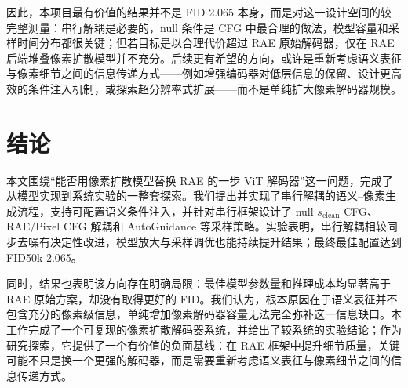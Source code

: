 \documentclass[11pt]{article}
\begin{document}
因此，本项目最有价值的结果并不是 FID 2.065 本身，而是对这一设计空间的较完整测量：串行解耦是必要的，null 条件是 CFG 中最合理的做法，模型容量和采样时间分布都很关键；但若目标是以合理代价超过 RAE 原始解码器，仅在 RAE 后端堆叠像素扩散模型并不充分。后续更有希望的方向，或许是重新考虑语义表征与像素细节之间的信息传递方式——例如增强编码器对低层信息的保留、设计更高效的条件注入机制，或探索超分辨率式扩展——而不是单纯扩大像素解码器规模。

\section{结论}

本文围绕“能否用像素扩散模型替换 RAE 的一步 ViT 解码器”这一问题，完成了从模型实现到系统实验的一整套探索。我们提出并实现了串行解耦的语义--像素生成流程，支持可配置语义条件注入，并针对串行框架设计了 null $s_{\mathrm{clean}}$ CFG、RAE/Pixel CFG 解耦和 AutoGuidance 等采样策略。实验表明，串行解耦相较同步去噪有决定性改进，模型放大与采样调优也能持续提升结果；最终最佳配置达到 FID50k 2.065。

同时，结果也表明该方向存在明确局限：最佳模型参数量和推理成本均显著高于 RAE 原始方案，却没有取得更好的 FID。我们认为，根本原因在于语义表征并不包含充分的像素级信息，单纯增加像素解码器容量无法完全弥补这一信息缺口。本工作完成了一个可复现的像素扩散解码器系统，并给出了较系统的实验结论；作为研究探索，它提供了一个有价值的负面基线：在 RAE 框架中提升细节质量，关键可能不只是换一个更强的解码器，而是需要重新考虑语义表征与像素细节之间的信息传递方式。
\end{document}
